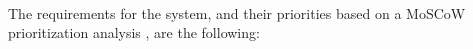 \paragraph{} The requirements for the system, and their priorities based on a MoSCoW prioritization analysis \cite{stapleton1997dsdm}, are the following: 





